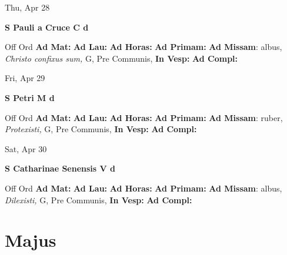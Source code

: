 \documentclass[10pt]{book}
\begin{document}
\begin{center}
\begin{minipage}{3.5in}
\vspace{2em}
\begin{center}Thu, Apr 28
\end{center}
\textbf{ \large S Pauli a Cruce C
\textnormal{\normalsize d}}

\begin{justify}Off Ord
\textbf{Ad Mat: }
\textbf{Ad Lau: }
\textbf{Ad Horas: }
\textbf{Ad Primam: }\textbf{Ad Missam}: albus, \textit{Christo confixus sum,} G, Pre Communis, 
\textbf{In Vesp: }
\textbf{Ad Compl: }
\end{justify}
\end{minipage}
\end{center}

\begin{center}
\begin{minipage}{3.5in}
\vspace{2em}
\begin{center}Fri, Apr 29
\end{center}
\textbf{ \large S Petri M
\textnormal{\normalsize d}}

\begin{justify}Off Ord
\textbf{Ad Mat: }
\textbf{Ad Lau: }
\textbf{Ad Horas: }
\textbf{Ad Primam: }\textbf{Ad Missam}: ruber, \textit{Protexisti,} G, Pre Communis, 
\textbf{In Vesp: }
\textbf{Ad Compl: }
\end{justify}
\end{minipage}
\end{center}

\begin{center}
\begin{minipage}{3.5in}
\vspace{2em}
\begin{center}Sat, Apr 30
\end{center}
\textbf{ \large S Catharinae Senensis V
\textnormal{\normalsize d}}

\begin{justify}Off Ord
\textbf{Ad Mat: }
\textbf{Ad Lau: }
\textbf{Ad Horas: }
\textbf{Ad Primam: }\textbf{Ad Missam}: albus, \textit{Dilexisti,} G, Pre Communis, 
\textbf{In Vesp: }
\textbf{Ad Compl: }
\end{justify}
\end{minipage}
\end{center}

    \chapter*{Majus}
                    
\end{document}
